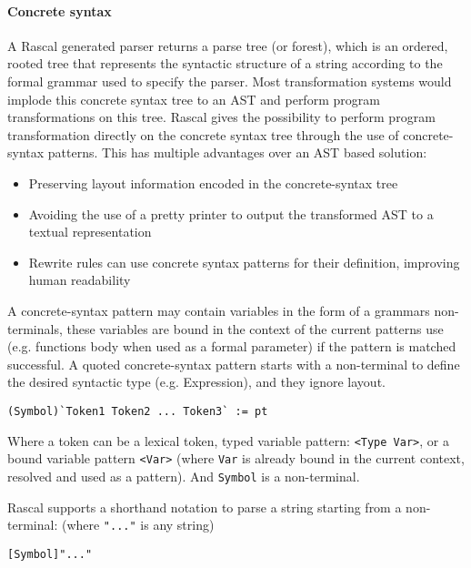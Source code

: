 \paragraph{Concrete syntax}
A Rascal generated parser returns a parse tree (or forest), which is an ordered, rooted tree that represents the syntactic structure of a string according to the formal grammar used to specify the parser. Most transformation systems would implode this concrete syntax tree to an AST and perform program transformations on this tree. Rascal gives the possibility to perform program transformation directly on the concrete syntax tree through the use of concrete-syntax patterns. This has multiple advantages over an AST based solution:
\begin{itemize}
	\item Preserving layout information encoded in the concrete-syntax tree
	\item Avoiding the use of a pretty printer to output the transformed AST to a textual representation
	\item Rewrite rules can use concrete syntax patterns for their definition, improving human readability
\end{itemize}
A concrete-syntax pattern may contain variables in the form of a grammars non-terminals, these variables are bound in the context of the current patterns use (e.g. functions body when used as a formal parameter) if the pattern is matched successful. A quoted concrete-syntax pattern starts with a non-terminal to define the desired syntactic type (e.g. Expression), and they ignore layout. 

\begin{lstlisting}
(Symbol)`Token1 Token2 ... Token3` := pt
\end{lstlisting}

Where a token can be a lexical token, typed variable pattern: \lstinline$<Type Var>$, or a bound variable pattern \lstinline$<Var>$ (where \lstinline$Var$ is already bound in the current context, resolved and used as a pattern). And \lstinline$Symbol$ is a non-terminal.

Rascal supports a shorthand notation to parse a string starting from a non-terminal: (where \lstinline$"..."$ is any string)

\begin{lstlisting}
[Symbol]"..."
\end{lstlisting}